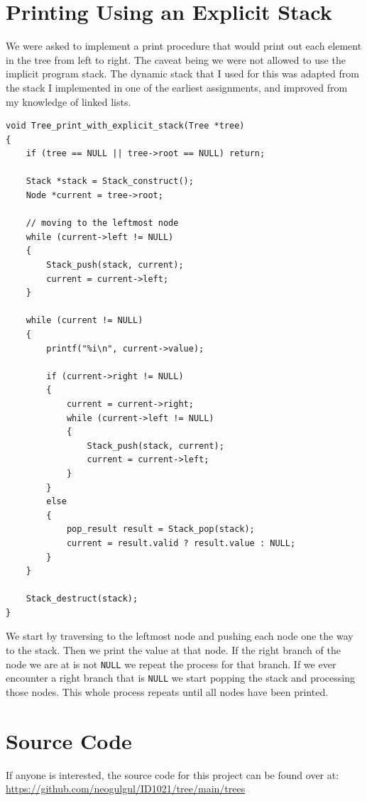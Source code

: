 \documentclass[a4paper, 11pt]{article}
\begin{document}
\section{Printing Using an Explicit Stack}
	We were asked to implement a print procedure that would print out each element in the tree from left to right.
	The caveat being we were not allowed to use the implicit program stack.
	The dynamic stack that I used for this was adapted from the stack I implemented in one of the earliest assignments,
	and improved from my knowledge of linked lists.
	\begin{verbatim}
void Tree_print_with_explicit_stack(Tree *tree)
{
	if (tree == NULL || tree->root == NULL) return;

	Stack *stack = Stack_construct();
	Node *current = tree->root;

	// moving to the leftmost node
	while (current->left != NULL)
	{
		Stack_push(stack, current);
		current = current->left;
	}

	while (current != NULL)
	{
		printf("%i\n", current->value);

		if (current->right != NULL)
		{
			current = current->right;
			while (current->left != NULL)
			{
				Stack_push(stack, current);
				current = current->left;
			}
		}
		else
		{
			pop_result result = Stack_pop(stack);
			current = result.valid ? result.value : NULL;
		}
	}

	Stack_destruct(stack);
}
	\end{verbatim}
	We start by traversing to the leftmost node and pushing each node one the way to the stack.
	Then we print the value at that node.
	If the right branch of the node we are at is not \texttt{NULL} we repeat the process for that branch.
	If we ever encounter a right branch that is \texttt{NULL} we start popping the stack and processing those nodes.
	This whole process repeats until all nodes have been printed.

\section{Source Code}
	If anyone is interested, the source code for this project can be found over at:
	\url{https://github.com/neogulgul/ID1021/tree/main/trees}
\end{document}
